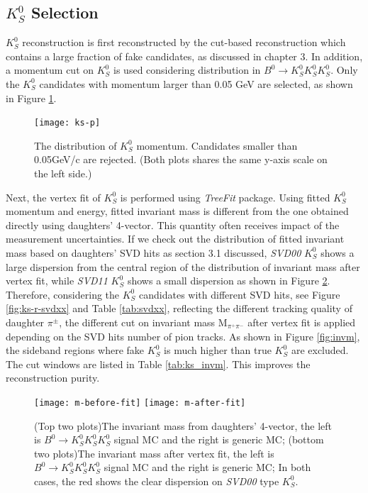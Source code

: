 \subsection{$K_S^0$ Selection}
$K_S^0$ reconstruction is first reconstructed by the cut-based reconstruction which contains a large fraction of fake candidates, as discussed in chapter 3. In addition, a momentum cut on $K_S^0$ is used considering distribution in $B^0 \to K_S^0  K_S^0  K_S^0$. Only the $K_S^0$ candidates with momentum larger than 0.05 GeV are selected, as shown in Figure \ref{fig:ks-p}. 
\begin{figure}[ht]
	\centering
	\texttt{[image: ks-p]}
	\caption{The distribution of $K_S^0$ momentum. Candidates smaller than 0.05GeV/c are rejected. (Both plots shares the same y-axis scale on the left side.)}
	\label{fig:ks-p}
\end{figure}
Next, the vertex fit of $K_S^0$ is performed using \textit{TreeFit} package\cite{refId0}. Using fitted $K_S^0$ momentum and energy, fitted invariant mass is different from the one obtained directly using daughters' 4-vector. This quantity often receives impact of the measurement uncertainties. If we check out the distribution of fitted invariant mass based on daughters' SVD hits as section 3.1 discussed, \textit{SVD00} $K_S^0$ shows a large dispersion from the central region of the distribution of invariant mass after vertex fit, while \textit{SVD11} $K_S^0$ shows a small dispersion as shown in Figure \ref{fig:invm1}. Therefore, considering the $K_S^0$ candidates with different SVD hits, see Figure \ref{fig:ks-r-svdxx} and Table \ref{tab:svdxx}, reflecting the different tracking quality of daughter $\pi^{\pm}$, the different cut on invariant mass M$_{\pi^+\pi^-}$ after vertex fit is applied depending on the SVD hits number of pion tracks. As shown in Figure \ref{fig:invm}, the sideband regions where fake $K_S^0$ is much higher than true $K_S^0$ are excluded. The cut windows are listed in Table \ref{tab:ks_invm}. This improves the reconstruction purity.

\begin{figure}[htpb]
\centering
\texttt{[image: m-before-fit]}
\texttt{[image: m-after-fit]}
\caption{(Top two plots)The invariant mass from daughters' 4-vector, the left is $B^0 \to K_S^0  K_S^0  K_S^0$  signal MC and the right is generic MC;
(bottom two plots)The invariant mass after vertex fit, the left is $B^0 \to K_S^0  K_S^0  K_S^0$  signal MC and the right is generic MC;
In both cases, the red shows the clear dispersion on \textit{SVD00} type $K_S^0$.}
\label{fig:invm1}
\end{figure}
 
